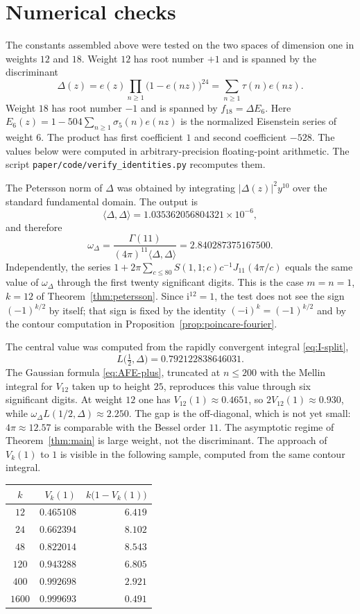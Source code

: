 \documentclass[11pt]{amsart}
\theoremstyle{definition}
\theoremstyle{remark}
\numberwithin{equation}{section}
\newcommand{\ii}{\mathrm{i}}
\begin{document}
\section{Numerical checks}
\label{sec:numerics}

The constants assembled above were tested on the two spaces of dimension one in weights $12$ and $18$. Weight $12$ has root number $+1$ and is spanned by the discriminant
\[
\Delta(z)=e(z)\prod_{n\ge 1}\bigl(1-e(nz)\bigr)^{24}=\sum_{n\ge 1}\tau(n)e(nz).
\]
Weight $18$ has root number $-1$ and is spanned by $f_{18}=\Delta E_6$. Here $E_6(z)=1-504\sum_{n\ge 1}\sigma_5(n)e(nz)$ is the normalized Eisenstein series of weight $6$. The product has first coefficient $1$ and second coefficient $-528$. The values below were computed in arbitrary-precision floating-point arithmetic. The script \texttt{paper/code/verify\_identities.py} recomputes them.

The Petersson norm of $\Delta$ was obtained by integrating $\lvert\Delta(z)\rvert^2 y^{10}$ over the standard fundamental domain. The output is
\[
\langle\Delta,\Delta\rangle
=1.035362056804321\times 10^{-6},
\]
and therefore
\[
\omega_\Delta
=\frac{\Gamma(11)}{(4\pi)^{11}\langle\Delta,\Delta\rangle}
=2.840287375167500.
\]
Independently, the series $1+2\pi\sum_{c\le 80}S(1,1;c)c^{-1}J_{11}(4\pi/c)$ equals the same value of $\omega_\Delta$ through the first twenty significant digits. This is the case $m=n=1$, $k=12$ of Theorem~\ref{thm:petersson}. Since $\ii^{12}=1$, the test does not see the sign $(-1)^{k/2}$ by itself; that sign is fixed by the identity $(-\ii)^k=(-1)^{k/2}$ and by the contour computation in Proposition~\ref{prop:poincare-fourier}.

The central value was computed from the rapidly convergent integral \eqref{eq:I-split},
\[
L\bigl(\tfrac12,\Delta\bigr)
=0.792122838646031.
\]
The Gaussian formula \eqref{eq:AFE-plus}, truncated at $n\le 200$ with the Mellin integral for $V_{12}$ taken up to height $25$, reproduces this value through six significant digits. At weight $12$ one has $V_{12}(1)\approx 0.4651$, so $2V_{12}(1)\approx 0.930$, while $\omega_\Delta L(1/2,\Delta)\approx 2.250$. The gap is the off-diagonal, which is not yet small: $4\pi\approx 12.57$ is comparable with the Bessel order $11$. The asymptotic regime of Theorem~\ref{thm:main} is large weight, not the discriminant. The approach of $V_k(1)$ to $1$ is visible in the following sample, computed from the same contour integral.

\begin{center}
\begin{tabular}{crr}
$k$ & $V_k(1)$ & $k\bigl(1-V_k(1)\bigr)$\\
\hline
$12$  & $0.465108$ & $6.419$\\
$24$  & $0.662394$ & $8.102$\\
$48$  & $0.822014$ & $8.543$\\
$120$ & $0.943288$ & $6.805$\\
$400$ & $0.992698$ & $2.921$\\
$1600$& $0.999693$ & $0.491$\\
\end{tabular}
\end{center}
\end{document}
